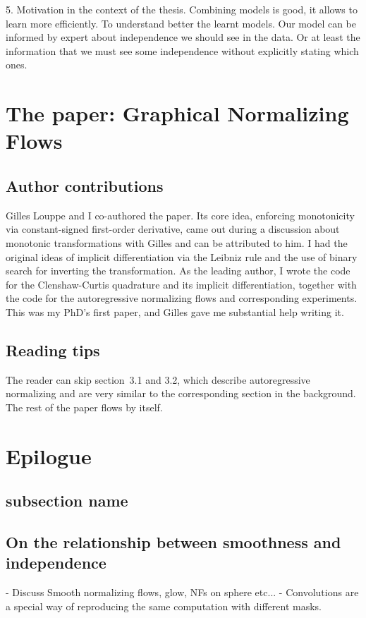 5. Motivation in the context of the thesis. Combining models is good, it allows to learn more efficiently. To understand better the learnt models. Our model can be informed by expert about independence we should see in the data. Or at least the information that we must see some independence without explicitly stating which ones.


\section{The paper: Graphical Normalizing Flows}
\subsection{Author contributions}
Gilles Louppe and I co-authored the paper. Its core idea, enforcing monotonicity via constant-signed first-order derivative, came out during a discussion about monotonic transformations with Gilles and can be attributed to him. I had the original ideas of implicit differentiation via the Leibniz rule and the use of binary search for inverting the transformation. As the leading author, I wrote the code for the Clenshaw-Curtis quadrature and its implicit differentiation, together with the code for the autoregressive normalizing flows and corresponding experiments. This was my PhD's first paper, and Gilles gave me substantial help writing it.

\subsection{Reading tips}
The reader can skip section~3.1 and 3.2, which describe autoregressive normalizing and are very similar to the corresponding section in the background. The rest of the paper flows by itself.



\section{Epilogue}
\subsection{subsection name}


\subsection{On the relationship between smoothness and independence}
- Discuss Smooth normalizing flows, glow, NFs on sphere etc...
- Convolutions are a special way of reproducing the same computation with different masks.

